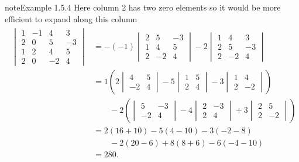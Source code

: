 \documentclass[letterpaper,10pt,english]{jupyterBook}
\begin{document}
\begin{sphinxadmonition}{note}{Example 1.5.4}
\sphinxAtStartPar
Here column 2 has two zero elements so it would be more efficient to expand along this column
\begin{equation*}
\begin{split} \begin{align*}
    \begin{vmatrix} 1 & -1 & 4 & 3 \\ 2 & 0 & 5 & -3 \\ 1 & 2 & 4 & 5 \\ 2 & 0 & -2 & 4 \end{vmatrix} &=
    - (-1) \begin{vmatrix}2 & 5 & -3 \\ 1 & 4 & 5 \\ 2 & -2 & 4 \end{vmatrix}
    - 2 \begin{vmatrix} 1 & 4 & 3 \\ 2 & 5 & -3 \\ 2 & -2 & 4 \end{vmatrix} \\
    &= 1\left(
        2 \begin{vmatrix} 4 & 5 \\ -2 & 4 \end{vmatrix}
      - 5\begin{vmatrix}1 & 5 \\ 2 & 4 \end{vmatrix}
      - 3 \begin{vmatrix} 1 & 4 \\ 2 & -2 \end{vmatrix}
    \right) \\
    & \qquad - 2 \left(
        \begin{vmatrix} 5 & -3 \\ -2 & 4 \end{vmatrix}
      - 4 \begin{vmatrix} 2 & -3 \\ 2 & 4 \end{vmatrix}
      + 3 \begin{vmatrix} 2 & 5 \\ 2 & -2 \end{vmatrix}
    \right) \\
    &= 2(16 + 10) - 5(4 - 10) - 3(-2-8) \\
    & \qquad - 2(20-6) + 8(8+6) - 6(-4-10) \\
    &= 280.
\end{align*} \end{split}
\end{equation*}\end{sphinxadmonition}
\end{document}
